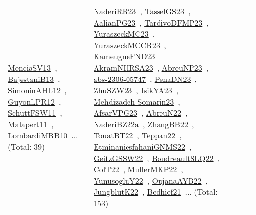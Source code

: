 {\begin{longtable}{lp{3cm}>{\raggedright\arraybackslash}p{6cm}>{\raggedright\arraybackslash}p{6cm}>{\raggedright\arraybackslash}p{8cm}}
\href{works/MenciaSV13.pdf}{MenciaSV13}~\cite{MenciaSV13}, \href{works/BajestaniB13.pdf}{BajestaniB13}~\cite{BajestaniB13}, \href{works/SimoninAHL12.pdf}{SimoninAHL12}~\cite{SimoninAHL12}, \href{works/GuyonLPR12.pdf}{GuyonLPR12}~\cite{GuyonLPR12}, \href{works/SchuttFSW11.pdf}{SchuttFSW11}~\cite{SchuttFSW11}, \href{works/Malapert11.pdf}{Malapert11}~\cite{Malapert11}, \href{works/LombardiMRB10.pdf}{LombardiMRB10}~\cite{LombardiMRB10}... (Total: 39) & \href{works/NaderiRR23.pdf}{NaderiRR23}~\cite{NaderiRR23}, \href{works/TasselGS23.pdf}{TasselGS23}~\cite{TasselGS23}, \href{works/AalianPG23.pdf}{AalianPG23}~\cite{AalianPG23}, \href{works/TardivoDFMP23.pdf}{TardivoDFMP23}~\cite{TardivoDFMP23}, \href{works/YuraszeckMC23.pdf}{YuraszeckMC23}~\cite{YuraszeckMC23}, \href{works/YuraszeckMCCR23.pdf}{YuraszeckMCCR23}~\cite{YuraszeckMCCR23}, \href{works/KameugneFND23.pdf}{KameugneFND23}~\cite{KameugneFND23}, \href{works/AkramNHRSA23.pdf}{AkramNHRSA23}~\cite{AkramNHRSA23}, \href{works/AbreuNP23.pdf}{AbreuNP23}~\cite{AbreuNP23}, \href{works/abs-2306-05747.pdf}{abs-2306-05747}~\cite{abs-2306-05747}, \href{works/PenzDN23.pdf}{PenzDN23}~\cite{PenzDN23}, \href{works/ZhuSZW23.pdf}{ZhuSZW23}~\cite{ZhuSZW23}, \href{works/IsikYA23.pdf}{IsikYA23}~\cite{IsikYA23}, \href{works/Mehdizadeh-Somarin23.pdf}{Mehdizadeh-Somarin23}~\cite{Mehdizadeh-Somarin23}, \href{works/AfsarVPG23.pdf}{AfsarVPG23}~\cite{AfsarVPG23}, \href{works/AbreuN22.pdf}{AbreuN22}~\cite{AbreuN22}, \href{works/NaderiBZ22a.pdf}{NaderiBZ22a}~\cite{NaderiBZ22a}, \href{works/ZhangBB22.pdf}{ZhangBB22}~\cite{ZhangBB22}, \href{works/TouatBT22.pdf}{TouatBT22}~\cite{TouatBT22}, \href{works/Teppan22.pdf}{Teppan22}~\cite{Teppan22}, \href{works/EtminaniesfahaniGNMS22.pdf}{EtminaniesfahaniGNMS22}~\cite{EtminaniesfahaniGNMS22}, \href{works/GeitzGSSW22.pdf}{GeitzGSSW22}~\cite{GeitzGSSW22}, \href{works/BoudreaultSLQ22.pdf}{BoudreaultSLQ22}~\cite{BoudreaultSLQ22}, \href{works/ColT22.pdf}{ColT22}~\cite{ColT22}, \href{works/MullerMKP22.pdf}{MullerMKP22}~\cite{MullerMKP22}, \href{works/YunusogluY22.pdf}{YunusogluY22}~\cite{YunusogluY22}, \href{works/OujanaAYB22.pdf}{OujanaAYB22}~\cite{OujanaAYB22}, \href{works/JungblutK22.pdf}{JungblutK22}~\cite{JungblutK22}, \href{works/Bedhief21.pdf}{Bedhief21}~\cite{Bedhief21}... (Total: 153)\\

\end{longtable}}
